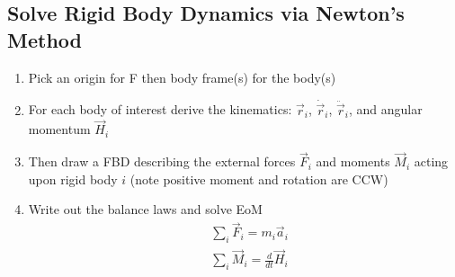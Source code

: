 \documentclass[conference]{IEEEtran}
\begin{document}
\subsection{Solve Rigid Body Dynamics via Newton's Method}
\begin{enumerate}
    \item Pick an origin for F then body frame(s) for the body(s)
    \item For each body of interest derive the kinematics: $\vec{r}_i$, $\dot{\vec{r}}_i$, $\ddot{\vec{r}}_i$, and angular momentum $\vec{H}_i$
    \item Then draw a FBD describing the external forces $\vec{F}_i$ and moments $\vec{M}_i$ acting upon rigid body $i$ (note positive moment and rotation are CCW)
    \item Write out the balance laws and solve EoM 
    \begin{align}
        & \sum_i \vec{F}_i = m_i \vec{a}_i \\
        & \sum_i \vec{M}_i = \frac{d}{dt}\vec{H}_i
    \end{align} 
\end{enumerate}
\end{document}
